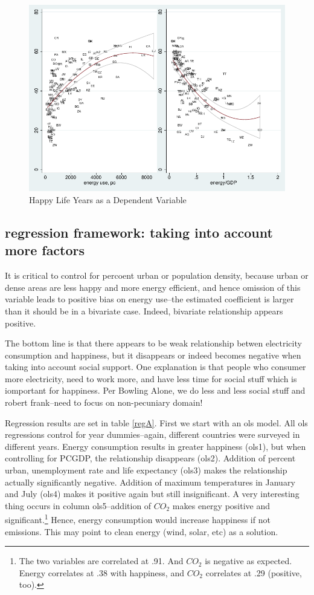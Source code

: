 \documentclass[10pt, letterpaper]{article}
\begin{document}
\begin{spacing}{1.4}
\begin{figure}[H]
 \includegraphics[width=6in]{graphsAndTables/couWdhEneGdpHly.pdf}\centering
\caption{Happy Life Years as a Dependent Variable}\label{hly}
\end{figure}


\subsection{regression framework: taking into account more factors} 

It is critical to control for percoent urban or population density, because
urban or dense areas are less happy and more energy efficient, and hence
omission of this variable leads to positive bias on energy use--the estimated
coefficient   is larger than it should be in a bivariate case. Indeed, bivariate
relationship appears positive. 

The bottom line is that there appears to be weak relationship betwen electricity
consumption and happiness, but it disappears or indeed becomes negative when
taking into account social support. One explanation is that people who consumer
more electricity, need to work more, and have less time for social stuff which
is iomportant for happiness. Per Bowling Alone, we do less and less social stuff
and robert frank--need to focus on non-pecuniary domain!

Regression results are set in table \ref{regA}. First we start with an ols
model. All ols regressions control for year dummies--again, different countries
were surveyed in different years. Energy consumption results in greater
happiness (ols1), but when controlling for PCGDP, the relationship disappears
(ols2). Addition of percent urban, unemployment rate and life expectancy (ols3)
makes the relationship actually significantly negative.  Addition of maximum
temperatures in January and July (ols4) makes it positive again but still
insignificant.  A very interesting thing occurs in column ols5--addition of
$CO_2$ makes energy positive and significant.\footnote{The two variables are
  correlated at .91. And $CO_2$ is negative as expected. Energy correlates at .38
  with happiness, and $CO_2$ correlates at .29 (positive, too).}
 Hence, energy consumption would increase happiness if not emissions. This may
 point to clean energy (wind, solar, etc) as a solution. 


\end{spacing}
\end{document}

